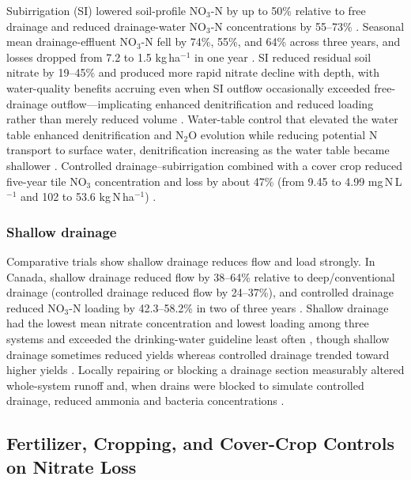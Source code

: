 \documentclass[11pt]{article}
\begin{document}
Subirrigation (SI) lowered soil-profile NO$_3$-N by up to 50\% relative to free drainage and reduced drainage-water NO$_3$-N concentrations by 55--73\% \parencite{Elmi2004}. Seasonal mean drainage-effluent NO$_3$-N fell by 74\%, 55\%, and 64\% across three years, and losses dropped from 7.2 to 1.5 kg\,ha$^{-1}$ in one year \parencite{Elmi2004}. SI reduced residual soil nitrate by 19--45\% and produced more rapid nitrate decline with depth, with water-quality benefits accruing even when SI outflow occasionally exceeded free-drainage outflow---implicating enhanced denitrification and reduced loading rather than merely reduced volume \parencite{Elmi2002}. Water-table control that elevated the water table enhanced denitrification and N$_2$O evolution while reducing potential N transport to surface water, denitrification increasing as the water table became shallower \parencite{KLIEWER1995}. Controlled drainage--subirrigation combined with a cover crop reduced five-year tile NO$_3$ concentration and loss by about 47\% (from 9.45 to 4.99 mg\,N\,L$^{-1}$ and 102 to 53.6 kg\,N\,ha$^{-1}$) \parencite{Drury2014}.

\subsubsection{Shallow drainage}

Comparative trials show shallow drainage reduces flow and load strongly. In Canada, shallow drainage reduced flow by 38--64\% relative to deep/conventional drainage (controlled drainage reduced flow by 24--37\%), and controlled drainage reduced NO$_3$-N loading by 42.3--58.2\% in two of three years \parencite{Smith2019}. Shallow drainage had the lowest mean nitrate concentration and lowest loading among three systems and exceeded the drinking-water guideline least often \parencite{Smith2011b,Smith2019}, though shallow drainage sometimes reduced yields whereas controlled drainage trended toward higher yields \parencite{Smith2019,Smith2011b}. Locally repairing or blocking a drainage section measurably altered whole-system runoff and, when drains were blocked to simulate controlled drainage, reduced ammonia and bacteria concentrations \parencite{Wesström2015,RITTER1995}.

\subsection{Fertilizer, Cropping, and Cover-Crop Controls on Nitrate Loss}
\end{document}
